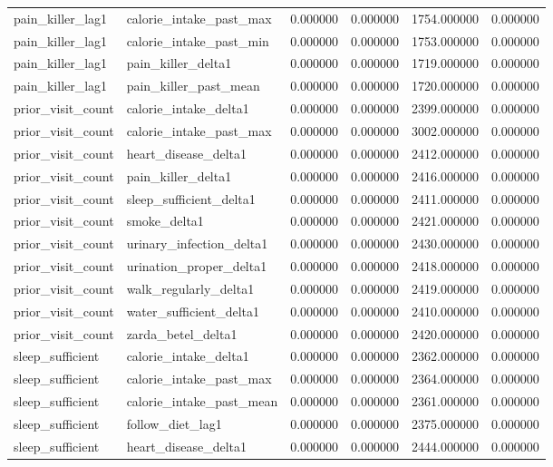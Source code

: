 \begin{longtable}{llrrrr}
pain\_killer\_lag1 & calorie\_intake\_past\_max & 0.000000 & 0.000000 & 1754.000000 & 0.000000 \\
pain\_killer\_lag1 & calorie\_intake\_past\_min & 0.000000 & 0.000000 & 1753.000000 & 0.000000 \\
pain\_killer\_lag1 & pain\_killer\_delta1 & 0.000000 & 0.000000 & 1719.000000 & 0.000000 \\
pain\_killer\_lag1 & pain\_killer\_past\_mean & 0.000000 & 0.000000 & 1720.000000 & 0.000000 \\
prior\_visit\_count & calorie\_intake\_delta1 & 0.000000 & 0.000000 & 2399.000000 & 0.000000 \\
prior\_visit\_count & calorie\_intake\_past\_max & 0.000000 & 0.000000 & 3002.000000 & 0.000000 \\
prior\_visit\_count & heart\_disease\_delta1 & 0.000000 & 0.000000 & 2412.000000 & 0.000000 \\
prior\_visit\_count & pain\_killer\_delta1 & 0.000000 & 0.000000 & 2416.000000 & 0.000000 \\
prior\_visit\_count & sleep\_sufficient\_delta1 & 0.000000 & 0.000000 & 2411.000000 & 0.000000 \\
prior\_visit\_count & smoke\_delta1 & 0.000000 & 0.000000 & 2421.000000 & 0.000000 \\
prior\_visit\_count & urinary\_infection\_delta1 & 0.000000 & 0.000000 & 2430.000000 & 0.000000 \\
prior\_visit\_count & urination\_proper\_delta1 & 0.000000 & 0.000000 & 2418.000000 & 0.000000 \\
prior\_visit\_count & walk\_regularly\_delta1 & 0.000000 & 0.000000 & 2419.000000 & 0.000000 \\
prior\_visit\_count & water\_sufficient\_delta1 & 0.000000 & 0.000000 & 2410.000000 & 0.000000 \\
prior\_visit\_count & zarda\_betel\_delta1 & 0.000000 & 0.000000 & 2420.000000 & 0.000000 \\
sleep\_sufficient & calorie\_intake\_delta1 & 0.000000 & 0.000000 & 2362.000000 & 0.000000 \\
sleep\_sufficient & calorie\_intake\_past\_max & 0.000000 & 0.000000 & 2364.000000 & 0.000000 \\
sleep\_sufficient & calorie\_intake\_past\_mean & 0.000000 & 0.000000 & 2361.000000 & 0.000000 \\
sleep\_sufficient & follow\_diet\_lag1 & 0.000000 & 0.000000 & 2375.000000 & 0.000000 \\
sleep\_sufficient & heart\_disease\_delta1 & 0.000000 & 0.000000 & 2444.000000 & 0.000000 \\

\end{longtable}
